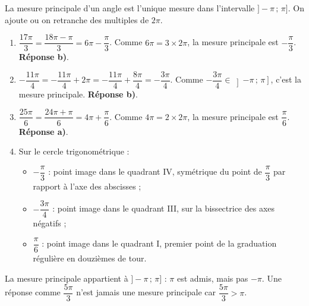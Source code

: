 \documentclass[11pt]{article}
\begin{document}
\begin{corrige}
La mesure principale d'un angle est l'unique mesure dans l'intervalle $]-\pi\,;\,\pi]$. On ajoute ou on retranche des multiples de $2\pi$.
\begin{enumerate}
\item $\dfrac{17\pi}{3} = \dfrac{18\pi - \pi}{3} = 6\pi - \dfrac{\pi}{3}$. Comme $6\pi = 3 \times 2\pi$, la mesure principale est $-\dfrac{\pi}{3}$. \textbf{Réponse b)}.
\item $-\dfrac{11\pi}{4} = -\dfrac{11\pi}{4} + 2\pi = -\dfrac{11\pi}{4} + \dfrac{8\pi}{4} = -\dfrac{3\pi}{4}$. Comme $-\dfrac{3\pi}{4} \in \left]-\pi\,;\,\pi\right]$, c'est la mesure principale. \textbf{Réponse b)}.
\item $\dfrac{25\pi}{6} = \dfrac{24\pi + \pi}{6} = 4\pi + \dfrac{\pi}{6}$. Comme $4\pi = 2 \times 2\pi$, la mesure principale est $\dfrac{\pi}{6}$. \textbf{Réponse a)}.
\item Sur le cercle trigonométrique :
\begin{itemize}
\item $-\dfrac{\pi}{3}$ : point image dans le quadrant IV, symétrique du point de $\dfrac{\pi}{3}$ par rapport à l'axe des abscisses ;
\item $-\dfrac{3\pi}{4}$ : point image dans le quadrant III, sur la bissectrice des axes négatifs ;
\item $\dfrac{\pi}{6}$ : point image dans le quadrant I, premier point de la graduation régulière en douzièmes de tour.
\end{itemize}
\end{enumerate}
\begin{attention}
La mesure principale appartient à $]-\pi\,;\,\pi]$ : $\pi$ est admis, mais pas $-\pi$. Une réponse comme $\dfrac{5\pi}{3}$ n'est jamais une mesure principale car $\dfrac{5\pi}{3} > \pi$.
\end{attention}
\end{corrige}
\end{document}

